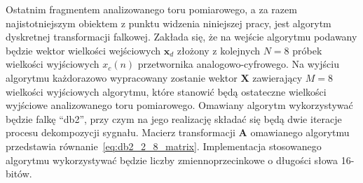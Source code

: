 Ostatnim fragmentem analizowanego toru pomiarowego, a za razem najistotniejszym obiektem z punktu widzenia niniejszej pracy, jest algorytm dyskretnej transformacji falkowej. Zakłada się, że na wejście algorytmu podawany będzie wektor wielkości wejściowych $\mathbf{x}_{d}$ złożony z kolejnych $N = 8$ próbek wielkości wyjściowych $x_{c}(n)$ przetwornika analogowo-cyfrowego. Na wyjściu algorytmu każdorazowo wypracowany zostanie wektor $\mathbf{X}$ zawierający $M = 8$ wielkości wyjściowych algorytmu, które stanowić będą ostateczne wielkości wyjściowe analizowanego toru pomiarowego. Omawiany algorytm wykorzystywać będzie falkę \enquote{db2}, przy czym na jego realizację składać się będą dwie iteracje procesu dekompozycji sygnału. Macierz transformacji $\mathbf{A}$ omawianego algorytmu przedstawia równanie~\eqref{eq:db2_2_8_matrix}. Implementacja stosowanego algorytmu wykorzystywać będzie liczby zmiennoprzecinkowe o długości słowa 16-bitów.


